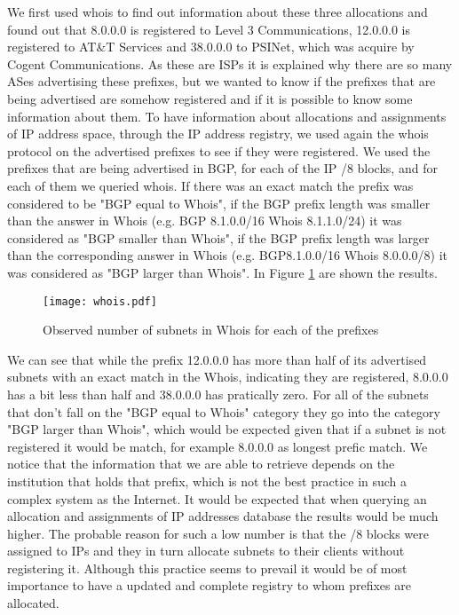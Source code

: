 \documentclass[11pt,a4paper]{scrreprt}
\begin{document}
We first used whois to find out information about these three allocations and found out that 8.0.0.0 is registered to Level 3 Communications, 12.0.0.0 is registered to AT\&T Services and 38.0.0.0 to PSINet, which was acquire by Cogent Communications.
As these are ISPs it is explained why there are so many ASes advertising these prefixes, but we wanted to know if the prefixes that are being advertised are somehow registered and if it is possible to know some information about them.
To have information about allocations and assignments of IP address space, through the IP address registry, we used again the whois protocol on the advertised prefixes to see if they were registered. We used the prefixes that are being advertised in BGP, for each of the IP /8 blocks, and for each of them we queried whois.
If there was an exact match the prefix was considered to be "BGP equal to Whois", if the BGP prefix length was smaller than the answer in Whois (e.g. BGP 8.1.0.0/16 Whois 8.1.1.0/24) it was considered as "BGP smaller than Whois", if the BGP prefix length was larger than the corresponding answer in Whois (e.g. BGP8.1.0.0/16 Whois 8.0.0.0/8) it was considered as "BGP larger than Whois". In Figure \ref{fig:whois} are shown the results.

\begin{figure}[!h]
\centering
\texttt{[image: whois.pdf]}
\caption{Observed number of subnets in Whois for each of the prefixes}
\label{fig:whois}
\end{figure}

We can see that while the prefix 12.0.0.0 has more than half of its advertised subnets with an exact match in the Whois, indicating they are registered, 8.0.0.0 has a bit less than half and 38.0.0.0 has pratically zero. For all of the subnets that don't fall on the "BGP equal to Whois" category they go into the category "BGP larger than Whois", which would be expected given that if a subnet is not registered it would be match, for example 8.0.0.0 as longest prefic match.
We notice that the information that we are able to retrieve depends on the institution that holds that prefix, which is not the best practice in such a complex system as the Internet. It would be expected that when querying an allocation and assignments of IP addresses database the results would be much higher. The probable reason for such a low number is that the /8 blocks were assigned to IPs and they in turn allocate subnets to their clients without registering it. Although this practice seems to prevail it would be of most importance to have a updated and complete registry to whom prefixes are allocated.
\end{document}
